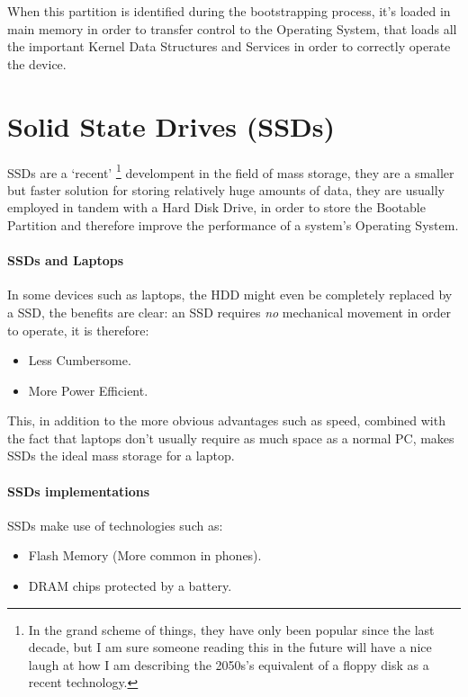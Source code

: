 \documentclass[openright, twoside]{report}
\theoremstyle{definition}
\theoremstyle{example}
\begin{document}
When this partition is identified during the bootstrapping process, it's 
loaded in main memory in order to transfer control to the Operating System, that 
loads all the important Kernel Data Structures and Services in order to correctly 
operate the device.

\section{Solid State Drives (SSDs)}
SSDs are a `recent' \footnote{In the grand scheme of things, they have only been popular 
since the last decade, but I am sure someone reading this in the future will have a nice laugh 
at how I am describing the 2050s's equivalent of a floppy disk as a recent technology.}
develompent in the field of mass storage, they are a smaller but faster solution for 
storing relatively huge amounts of data, they are usually employed in tandem with a Hard 
Disk Drive, in order to store the Bootable Partition and therefore improve the performance 
of a system's Operating System.

\paragraph{SSDs and Laptops}
In some devices such as laptops, the HDD might even be completely replaced by a SSD, 
the benefits are clear: an SSD requires \emph{no} mechanical movement in order to operate, 
it is therefore:

\begin{itemize}
	\item Less Cumbersome.
	\item More Power Efficient.
\end{itemize}

This, in addition to the more obvious advantages such as speed, combined with the fact that 
laptops don't usually require as much space as a normal PC, makes SSDs the ideal mass storage 
for a laptop.

\paragraph{SSDs implementations}
SSDs make use of technologies such as:

\begin{itemize}
	\item Flash Memory (More common in phones).
	\item DRAM chips protected by a battery.
\end{itemize}
\end{document}
